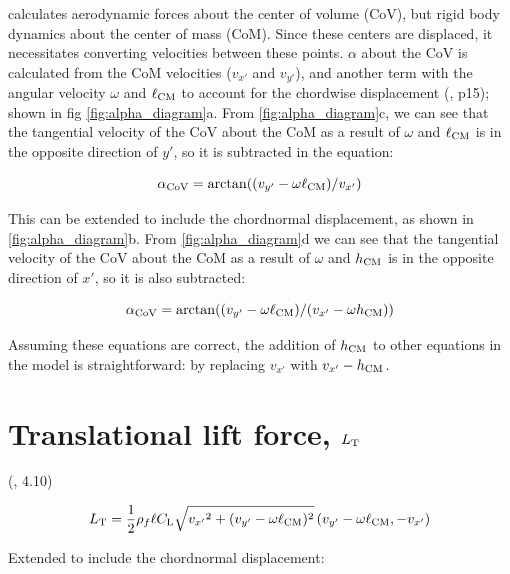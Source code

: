 \documentclass{jfm} %
\begin{document}
\cite{Li2022model} calculates aerodynamic forces about the center of volume (CoV), but rigid body dynamics about the center of mass (CoM). Since these centers are displaced, it necessitates converting velocities between these points. $\alpha$ about the CoV is calculated from the CoM velocities ($v_{x'}$ and $v_{y'}$), and another term with the angular velocity $\omega$ and $\ell_{\textup{CM}}$ to account for the chordwise displacement (\cite{Li2022model}, p15); shown in fig \ref{fig:alpha_diagram}a. From \ref{fig:alpha_diagram}c, we can see that the tangential velocity of the CoV about the CoM as a result of $\omega$ and $\ell_{\textup{CM}}$ is in the opposite direction of $y'$, so it is subtracted in the equation:

\begin{equation} \alpha_{\textnormal{CoV}} = \arctan((v_{y'} - \omega\ell_{\textup{CM}})/v_{x'}) \label{eq:alpha1} \end{equation}

This can be extended to include the chordnormal displacement, as shown in  \ref{fig:alpha_diagram}b. From \ref{fig:alpha_diagram}d we can see that the tangential velocity of the CoV about the CoM as a result of $\omega$ and $h_{\textup{CM}}$ is in the opposite direction of $x'$, so it is also subtracted:

\begin{equation} \alpha_{\textnormal{CoV}}  = \arctan((v_{y'} - \omega\ell_{\textup{CM}})/(v_{x'}- \omega h_{\textup{CM}})) \label{eq:alpha2} \end{equation} 

Assuming these equations are correct, the addition of $h_{\textup{CM}}$ to other equations in the model is straightforward: by replacing $v_{x'}$ with $v_{x'}-h_{\textup{CM}}$.

\section{Translational lift force, $L_{\textnormal{T}}$} \label{sec:lt}

(\cite{Li2022model}, 4.10)

\begin{equation}
 L_{\textnormal{T}} = \frac{1}{2}\rho_f\ell C_{\textnormal{L}}\sqrt{{v_{x'}}^2+(v_{y'}- \omega \ell_{\textup{CM}})^2}\left ( v_{y'}- \omega\ell_{\textup{CM}}, {-v_{x'}} \right ) 
\end{equation}

Extended to include the chordnormal displacement:
\end{document}
